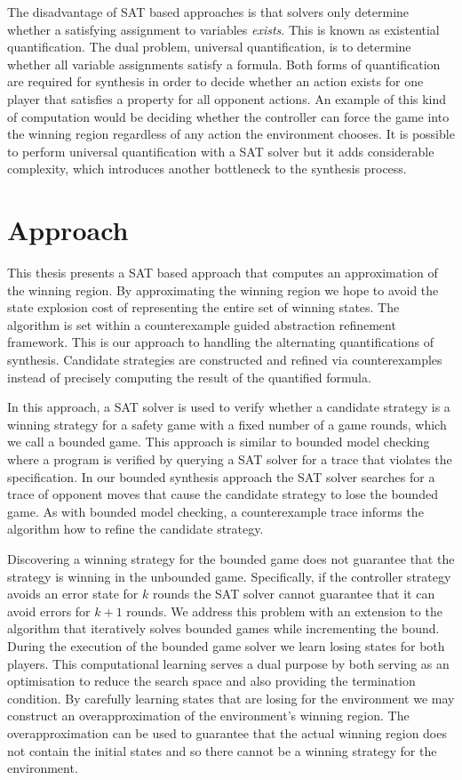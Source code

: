 The disadvantage of SAT based approaches is that solvers only determine whether a satisfying assignment to variables \emph{exists}. This is known as existential quantification. The dual problem, universal quantification, is to determine whether all variable assignments satisfy a formula. Both forms of quantification are required for synthesis in order to decide whether an action exists for one player that satisfies a property for all opponent actions. An example of this kind of computation would be deciding whether the controller can force the game into the winning region regardless of any action the environment chooses. It is possible to perform universal quantification with a SAT solver but it adds considerable complexity, which introduces another bottleneck to the synthesis process.

\section{Approach}

This thesis presents a SAT based approach that computes an approximation of the winning region. By approximating the winning region we hope to avoid the state explosion cost of representing the entire set of winning states. The algorithm is set within a counterexample guided abstraction refinement framework. This is our approach to handling the alternating quantifications of synthesis. Candidate strategies are constructed and refined via counterexamples instead of precisely computing the result of the quantified formula.

In this approach, a SAT solver is used to verify whether a candidate strategy is a winning strategy for a safety game with a fixed number of a game rounds, which we call a bounded game. This approach is similar to bounded model checking where a program is verified by querying a SAT solver for a trace that violates the specification. In our bounded synthesis approach the SAT solver searches for a trace of opponent moves that cause the candidate strategy to lose the bounded game. As with bounded model checking, a counterexample trace informs the algorithm how to refine the candidate strategy.

Discovering a winning strategy for the bounded game does not guarantee that the strategy is winning in the unbounded game. Specifically, if the controller strategy avoids an error state for $k$ rounds the SAT solver cannot guarantee that it can avoid errors for $k+1$ rounds. We address this problem with an extension to the algorithm that iteratively solves bounded games while incrementing the bound. During the execution of the bounded game solver we learn losing states for both players. This computational learning serves a dual purpose by both serving as an optimisation to reduce the search space and also providing the termination condition. By carefully learning states that are losing for the environment we may construct an overapproximation of the environment's winning region. The overapproximation can be used to guarantee that the actual winning region does not contain the initial states and so there cannot be a winning strategy for the environment.


